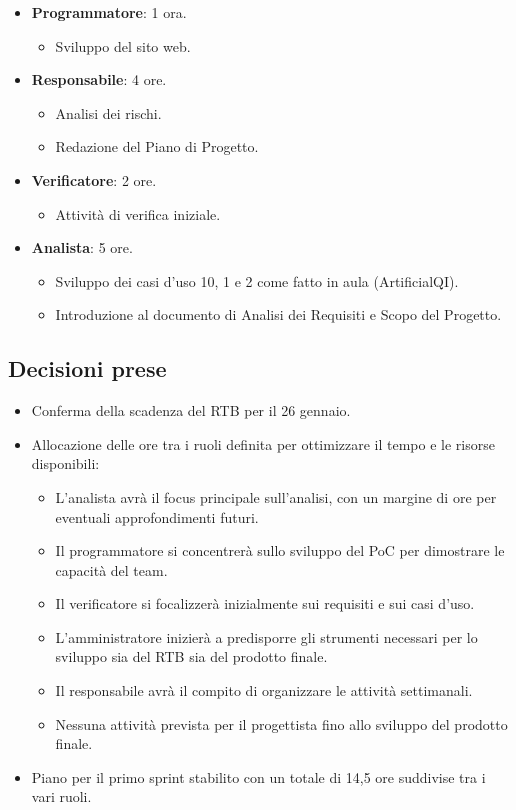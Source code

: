 \documentclass[a4paper, 12pt]{article}
\begin{document}
\begin{itemize}
\begin{itemize}
        \item \textbf{Programmatore}: 1 ora.
            \begin{itemize}
                \item Sviluppo del sito web.
            \end{itemize}
        \item \textbf{Responsabile}: 4 ore.
            \begin{itemize}
                \item Analisi dei rischi.
                \item Redazione del Piano di Progetto.
            \end{itemize}
        \item \textbf{Verificatore}: 2 ore.
            \begin{itemize}
                \item Attività di verifica iniziale.
            \end{itemize}
        \item \textbf{Analista}: 5 ore.
            \begin{itemize}
                \item Sviluppo dei casi d'uso 10, 1 e 2 come fatto in aula (ArtificialQI).
                \item Introduzione al documento di Analisi dei Requisiti e Scopo del Progetto.
            \end{itemize}
    \end{itemize}
\end{itemize}

\subsection{Decisioni prese}
\begin{itemize}
    \item Conferma della scadenza del RTB per il 26 gennaio.
    \item Allocazione delle ore tra i ruoli definita per ottimizzare il tempo e le risorse disponibili:
    \begin{itemize}
        \item L'analista avrà il focus principale sull'analisi, con un margine di ore per eventuali approfondimenti futuri.
        \item Il programmatore si concentrerà sullo sviluppo del PoC per dimostrare le capacità del team.
        \item Il verificatore si focalizzerà inizialmente sui requisiti e sui casi d'uso.
        \item L'amministratore inizierà a predisporre gli strumenti necessari per lo sviluppo sia del RTB sia del prodotto finale.
        \item Il responsabile avrà il compito di organizzare le attività settimanali.
        \item Nessuna attività prevista per il progettista fino allo sviluppo del prodotto finale.
    \end{itemize}
    \item Piano per il primo sprint stabilito con un totale di 14,5 ore suddivise tra i vari ruoli.
\end{itemize}
\end{document}
